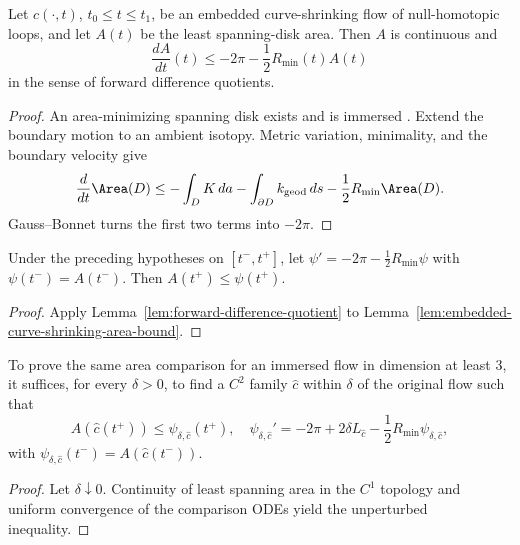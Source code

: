 \begin{lemma}
\label{lem:embedded-curve-shrinking-area-bound}
\label{embcase}
Let $c(\cdot,t)$, $t_0\le t\le t_1$, be an embedded curve-shrinking flow of
null-homotopic loops, and let $A(t)$ be the least spanning-disk area. Then
$A$ is continuous and
\[
\frac{dA}{dt}(t)\le-2\pi-\frac12R_{\min}(t)A(t)
\]
in the sense of forward difference quotients.
\end{lemma}
\begin{proof}
\sketch An area-minimizing spanning disk exists and is immersed
\cite{Hildebrandt,Morrey,HardtSimon,GL}. Extend the boundary motion to an
ambient isotopy. Metric variation, minimality, and the boundary velocity give
\[
\frac d{dt}\Area(D)\le-\int_DK\,da-\int_{\partial D}k_{\mathrm{geod}}\,ds
-\frac12R_{\min}\Area(D).
\]
Gauss--Bonnet turns the first two terms into $-2\pi$.
\end{proof}

\begin{corollary}
\label{cor:embedded-curve-shrinking-area-comparison}
Under the preceding hypotheses on $[t^-,t^+]$, let
$\psi'=-2\pi-\frac12R_{\min}\psi$ with $\psi(t^-)=A(t^-)$. Then
$A(t^+)\le\psi(t^+)$.
\end{corollary}
\begin{proof}
\sketch Apply Lemma~\ref{lem:forward-difference-quotient} to
Lemma~\ref{lem:embedded-curve-shrinking-area-bound}.
\end{proof}

\begin{claim}
\label{claim:curve-shrinking-approximation-suffices}
To prove the same area comparison for an immersed flow in dimension at least
$3$, it suffices, for every $\delta>0$, to find a $C^2$ family $\hat c$ within
$\delta$ of the original flow such that
\[
A(\hat c(t^+))\le\psi_{\delta,\hat c}(t^+),
\quad
\psi_{\delta,\hat c}'=-2\pi+2\delta L_{\hat c}
-\frac12R_{\min}\psi_{\delta,\hat c},
\]
with $\psi_{\delta,\hat c}(t^-)=A(\hat c(t^-))$.
\end{claim}
\begin{proof}
\sketch Let $\delta\downarrow0$. Continuity of least spanning area in the
$C^1$ topology and uniform convergence of the comparison ODEs yield the
unperturbed inequality.
\end{proof}

